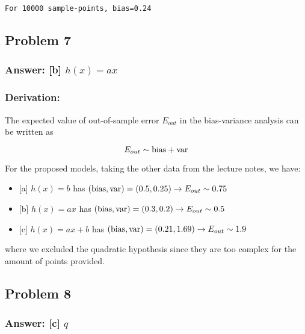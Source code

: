 \documentclass[11pt]{article}
\providecommand{\tightlist}{%
      \setlength{\itemsep}{0pt}\setlength{\parskip}{0pt}}
\begin{document}
    \begin{Verbatim}[commandchars=\\\{\}]
For 10000 sample-points, bias=0.24
    \end{Verbatim}

    \hypertarget{problem-7}{%
\subsection{Problem 7}\label{problem-7}}

\hypertarget{answer-b-hxax}{%
\subsubsection{\texorpdfstring{Answer: {[}b{]}
\(h(x)=ax\)}{Answer: {[}b{]} h(x)=ax}}\label{answer-b-hxax}}

\hypertarget{derivation}{%
\subsubsection{Derivation:}\label{derivation}}

The expected value of out-of-sample error \(E_{out}\) in the
bias-variance analysis can be written as

\[
E_{out}\sim{\rm bias}+{\rm var}
\]

For the proposed models, taking the other data from the lecture notes,
we have:

\begin{itemize}
\tightlist
\item
  {[}a{]} \(h(x)=b\) has
  \(({\rm bias},{\rm var})=(0.5,0.25)\rightarrow E_{out}\sim 0.75\)
\item
  {[}b{]} \(h(x)=ax\) has
  \(({\rm bias},{\rm var})=(0.3,0.2)\rightarrow E_{out}\sim 0.5\)
\item
  {[}c{]} \(h(x)=ax+b\) has
  \(({\rm bias},{\rm var})=(0.21,1.69)\rightarrow E_{out}\sim 1.9\)
\end{itemize}

where we excluded the quadratic hypothesis since they are too complex
for the amount of points provided.

    \hypertarget{problem-8}{%
\subsection{Problem 8}\label{problem-8}}

\hypertarget{answer-c-q}{%
\subsubsection{\texorpdfstring{Answer: {[}c{]}
\(q\)}{Answer: {[}c{]} q}}\label{answer-c-q}}
\end{document}
